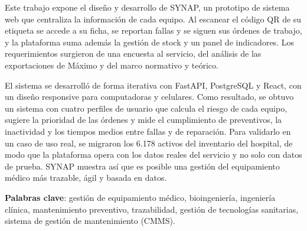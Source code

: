 \documentclass[10pt]{article}
\begin{document}
Este trabajo expone el diseño y desarrollo de SYNAP, un prototipo de sistema web que centraliza la información de cada equipo. Al escanear el código QR de su etiqueta se accede a su ficha, se reportan fallas y se siguen sus órdenes de trabajo, y la plataforma suma además la gestión de stock y un panel de indicadores. Los requerimientos surgieron de una encuesta al servicio, del análisis de las exportaciones de Máximo y del marco normativo y teórico. 

El sistema se desarrolló de forma iterativa con FastAPI, PostgreSQL y React, con un diseño responsive para computadoras y celulares. Como resultado, se obtuvo un sistema con cuatro perfiles de usuario que calcula el riesgo de cada equipo, sugiere la prioridad de las órdenes y mide el cumplimiento de preventivos, la inactividad y los tiempos medios entre fallas y de reparación. Para validarlo en un caso de uso real, se migraron los 6.178 activos del inventario del hospital, de modo que la plataforma opera con los datos reales del servicio y no solo con datos de prueba. SYNAP muestra así que es posible una gestión del equipamiento médico más trazable, ágil y basada en datos.


\vspace{\baselineskip}
\noindent\textbf{Palabras clave}: gestión de equipamiento médico, bioingeniería, ingeniería clínica, mantenimiento preventivo, trazabilidad, gestión de tecnologías sanitarias, sistema de gestión de mantenimiento (CMMS).
\end{document}
